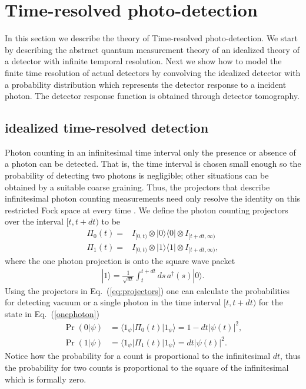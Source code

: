 \documentclass[aps,pra,twocolumn,amsmath,amssymb,color,superscriptaddress]{revtex4}
\newcommand{\bra}[1]{\langle#1|}
\newcommand{\ket}[1]{|#1\rangle}
\newcommand{\outp}[2]{\ket{#1}\bra{#2}}     %
\newcommand{\erf}[1]{Eq.~(\ref{#1})}
\newcommand{\Id}{I}
\begin{document}
%
%
\section{Time-resolved photo-detection} \label{sec:det_model}
In this section we describe the theory of Time-resolved photo-detection. We start by describing the abstract quantum measurement theory of an idealized theory of a detector with infinite temporal resolution. Next we show how to model the finite time resolution of actual detectors by convolving the idealized detector with a probability distribution which represents the detector response to a incident photon. The detector response function is obtained through detector tomography.
 
 \subsection{idealized time-resolved detection}
Photon counting in an infinitesimal time interval only the presence or absence of a photon can be detected. That is, the time interval is chosen small enough so the probability of detecting two photons is negligible; other situations can be obtained by a suitable coarse graining. Thus, the projectors that describe infinitesimal photon counting measurements need only resolve the identity on this restricted Fock space at every time \cite{JackCollett}. We define the photon counting projectors over the interval $[t,t + dt)$ to be
\begin{subequations}\label{eq:projectors}
\begin{align} 
		\Pi_0 (t) = & \Id_{[0,t)}\otimes \outp{0}{0} \otimes \Id_{[t+dt,\infty)}\\
		\Pi_1(t)                 = & \Id_{[0,t)}\otimes \outp{1}{1} \otimes \Id_{[t+dt,\infty)},
\end{align}
\end{subequations}
where the one photon projection is onto the square wave packet
\begin{align}\label{eq:InfinitesimalState}
		\ket{1}= \frac{1}{\sqrt{dt}}  \int_{t}^{t+dt} ds\, a^\dagger (s) \ket{0} .
\end{align}
Using the projectors in \erf{eq:projectors} one can calculate the probabilities for detecting vacuum or a single photon in the time interval $[t,t + dt)$ for the state in \erf{onephoton} 
\begin{subequations}\label{asdf}
\begin{align} 
\Pr(0|\psi) &= \bra{1_\psi} \Pi_0 (t)\ket{1_\psi}= 1-dt|\psi(t)|^2,\\
\Pr(1|\psi) &= \bra{1_\psi} \Pi_1 (t)\ket{1_\psi}= dt|\psi(t)|^2.
\end{align}
\end{subequations}
Notice how the probability for a count is proportional to the infinitesimal $dt$, thus the probability for two counts is proportional to the square of the infinitesimal which is formally zero.
\end{document}

